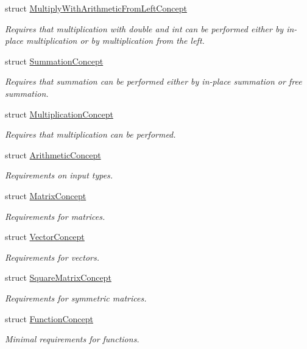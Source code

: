\begin{DoxyCompactItemize}
struct \hyperlink{structFunG_1_1Concepts_1_1MultiplyWithArithmeticFromLeftConcept}{\-Multiply\-With\-Arithmetic\-From\-Left\-Concept}
\begin{DoxyCompactList}\small\item\em \-Requires that multiplication with double and int can be performed either by in-\/place multiplication or by multiplication from the left. \end{DoxyCompactList}\item 
struct \hyperlink{structFunG_1_1Concepts_1_1SummationConcept}{\-Summation\-Concept}
\begin{DoxyCompactList}\small\item\em \-Requires that summation can be performed either by in-\/place summation or free summation. \end{DoxyCompactList}\item 
struct \hyperlink{structFunG_1_1Concepts_1_1MultiplicationConcept}{\-Multiplication\-Concept}
\begin{DoxyCompactList}\small\item\em \-Requires that multiplication can be performed. \end{DoxyCompactList}\item 
struct \hyperlink{structFunG_1_1Concepts_1_1ArithmeticConcept}{\-Arithmetic\-Concept}
\begin{DoxyCompactList}\small\item\em \-Requirements on input types. \end{DoxyCompactList}\item 
struct \hyperlink{structFunG_1_1Concepts_1_1MatrixConcept}{\-Matrix\-Concept}
\begin{DoxyCompactList}\small\item\em \-Requirements for matrices. \end{DoxyCompactList}\item 
struct \hyperlink{structFunG_1_1Concepts_1_1VectorConcept}{\-Vector\-Concept}
\begin{DoxyCompactList}\small\item\em \-Requirements for vectors. \end{DoxyCompactList}\item 
struct \hyperlink{structFunG_1_1Concepts_1_1SquareMatrixConcept}{\-Square\-Matrix\-Concept}
\begin{DoxyCompactList}\small\item\em \-Requirements for symmetric matrices. \end{DoxyCompactList}\item 
struct \hyperlink{structFunG_1_1Concepts_1_1FunctionConcept}{\-Function\-Concept}
\begin{DoxyCompactList}\small\item\em \-Minimal requirements for functions. \end{DoxyCompactList}\end{DoxyCompactItemize}
